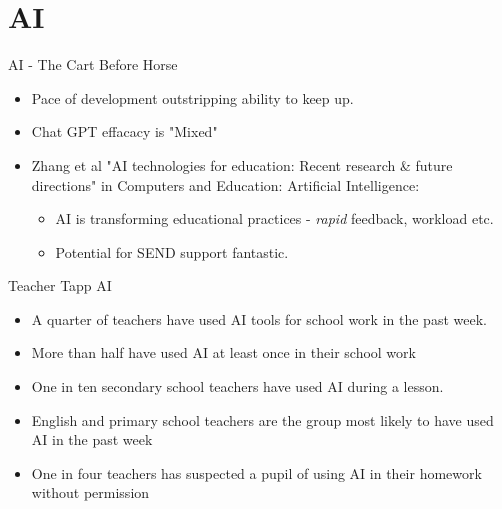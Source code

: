 \documentclass{beamer}					%
\begin{document}
\section{AI}
\begin{frame}{AI - The Cart Before Horse}
    \begin{itemize}
    \item Pace of development outstripping ability to keep up.
     \item Chat GPT effacacy is "Mixed"
    \item Zhang et al "AI technologies for education: Recent research \& future directions" in Computers and Education: Artificial Intelligence: 
    \begin{itemize}
        \item AI is transforming educational practices - \emph{rapid} feedback, workload etc. 
        \item Potential for SEND support fantastic.
    \end{itemize}\end{itemize}
\end{frame}
\begin{frame}{Teacher Tapp AI}
\begin{itemize}
\item A quarter of teachers have used AI tools for school work in the past week. 
\item More than half have used AI at least once in their school work 
\item One in ten secondary school teachers have used AI during a lesson. \item English and primary school teachers are the group most likely to have used AI in the past week
\item One in four teachers has suspected a pupil of using AI in their homework without permission
\end{itemize}
\end{frame}
\end{document}
